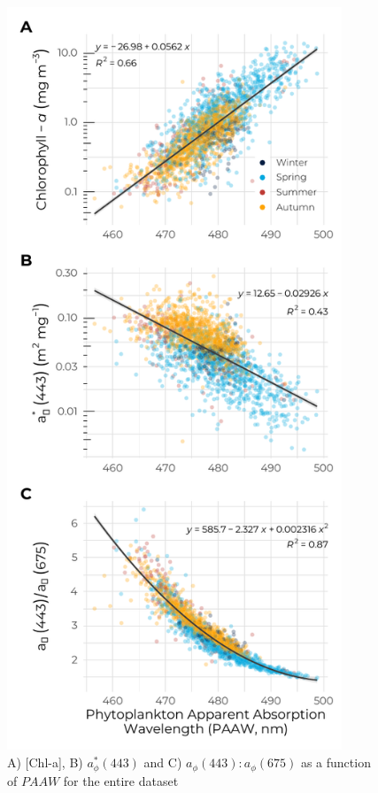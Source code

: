 \documentclass[utf8]{frontiersSCNS} %
\begin{document}
\begin{figure}[h!]
\begin{center}
\includegraphics[width=10cm]{fig08.pdf}
\end{center}
\caption{A) [Chl-a], B) $a^*_\phi(443)$ and C) $a_\phi(443):a_\phi(675)$ as a function of $PAAW$ for the entire dataset}\label{fig:8}
\end{figure}
\end{document}
